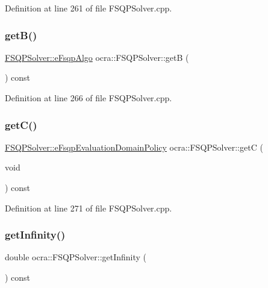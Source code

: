 Definition at line 261 of file F\+S\+Q\+P\+Solver.\+cpp.

\hypertarget{classocra_1_1FSQPSolver_af5f7b99450125e07eba99edaaf1ab372}{}\label{classocra_1_1FSQPSolver_af5f7b99450125e07eba99edaaf1ab372} 
\subsubsection{\texorpdfstring{get\+B()}{getB()}}
{\footnotesize\ttfamily \hyperlink{classocra_1_1FSQPSolver_ad43d4e2dae6954df05123077cea0b7f5}{F\+S\+Q\+P\+Solver\+::e\+Fsqp\+Algo} ocra\+::\+F\+S\+Q\+P\+Solver\+::getB (\begin{DoxyParamCaption}{ }\end{DoxyParamCaption}) const}



Definition at line 266 of file F\+S\+Q\+P\+Solver.\+cpp.

\hypertarget{classocra_1_1FSQPSolver_a0eb5fe693fc9a34039e69945e9fdf484}{}\label{classocra_1_1FSQPSolver_a0eb5fe693fc9a34039e69945e9fdf484} 
\subsubsection{\texorpdfstring{get\+C()}{getC()}}
{\footnotesize\ttfamily \hyperlink{classocra_1_1FSQPSolver_a0569ab06022ffef1bd6d97599a5e4279}{F\+S\+Q\+P\+Solver\+::e\+Fsqp\+Evaluation\+Domain\+Policy} ocra\+::\+F\+S\+Q\+P\+Solver\+::getC (\begin{DoxyParamCaption}\item[{void}]{ }\end{DoxyParamCaption}) const}



Definition at line 271 of file F\+S\+Q\+P\+Solver.\+cpp.

\hypertarget{classocra_1_1FSQPSolver_a8ee2a33cb9ec5991ac7fce0802e26c6b}{}\label{classocra_1_1FSQPSolver_a8ee2a33cb9ec5991ac7fce0802e26c6b} 
\subsubsection{\texorpdfstring{get\+Infinity()}{getInfinity()}}
{\footnotesize\ttfamily double ocra\+::\+F\+S\+Q\+P\+Solver\+::get\+Infinity (\begin{DoxyParamCaption}{ }\end{DoxyParamCaption}) const}



